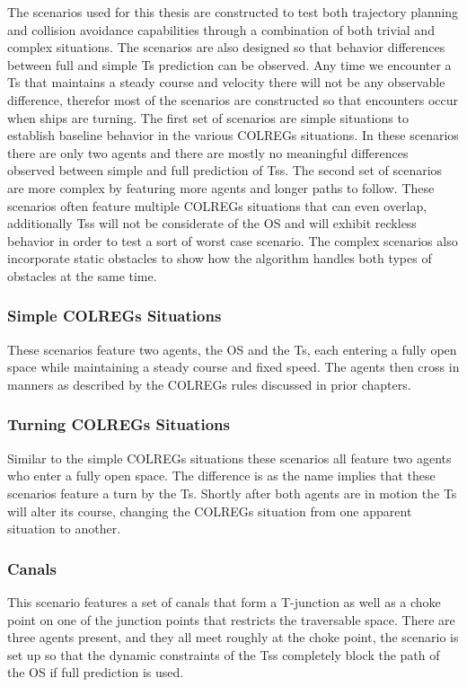 The scenarios used for this thesis are constructed to test both trajectory planning and collision avoidance capabilities through
a combination of both trivial and complex situations. The scenarios are also designed so that behavior differences between
full and simple \gls{Ts} prediction can be observed. Any time we encounter a \gls{Ts} that maintains a steady course and
velocity there will not be any observable difference, therefor most of the scenarios are constructed so that encounters occur
when ships are turning.
The first set of scenarios are simple situations to establish baseline behavior in the various \gls{COLREGs} situations. In these scenarios there are only 
two agents and there are mostly no meaningful differences observed between simple and full prediction of \gls{Ts}s. 
The second set of scenarios are more complex by featuring more agents and longer paths to follow. These scenarios often feature multiple \gls{COLREGs} situations that can
even overlap, additionally \gls{Ts}s will not be considerate of the \gls{OS} and will exhibit reckless behavior in order to test a sort of worst case scenario.
The complex scenarios also incorporate static obstacles to show how the algorithm handles both types of obstacles at the same time.

\subsubsection*{Simple COLREGs Situations}
These scenarios feature two agents, the \gls{OS} and the \gls{Ts}, each entering a fully open space while maintaining a
steady course and fixed speed. The agents then cross in manners as described by the \gls{COLREGs} rules discussed in prior chapters.


\subsubsection*{Turning COLREGs Situations}
Similar to the simple \gls{COLREGs} situations these scenarios all feature two agents who enter a fully open space. The difference
is as the name implies that these scenarios feature a turn by the \gls{Ts}. Shortly after both agents are in motion the \gls{Ts}
will alter its course, changing the COLREGs situation from one apparent situation to another.

\subsubsection*{Canals}
This scenario features a set of canals that form a T-junction as well as a choke point on one of the junction points that restricts
the traversable space. There are three agents present, and they all meet roughly at the choke point, the scenario is set up so that
the dynamic constraints of the \gls{Ts}s completely block the path of the \gls{OS} if full prediction is used.

